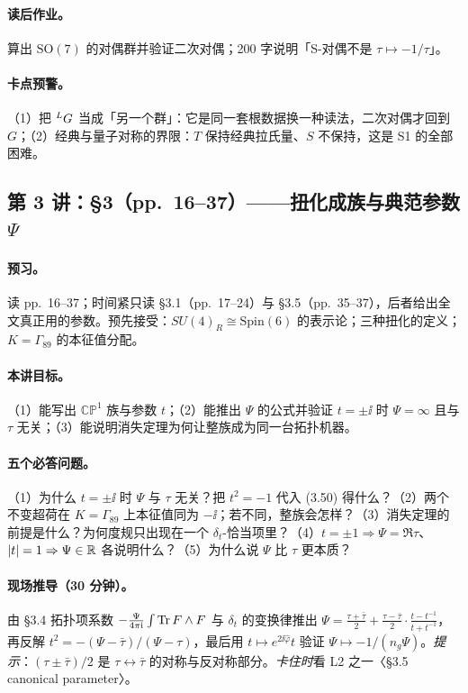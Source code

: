 {\paragraph{读后作业。}算出 \(\mathrm{SO}(7)\) 的对偶群并验证二次对偶；200 字说明「S-对偶不是 \(\tau\mapsto-1/\tau\)」。\pC

\paragraph{卡点预警。}（1）把 \({}^{L}G\) 当成「另一个群」：它是同一套根数据换一种读法，二次对偶才回到 \(G\)；（2）经典与量子对称的界限：\(T\) 保持经典拉氏量、\(S\) 不保持，这是 S1 的全部困难。\pC

\subsection{第 3 讲：\S3（pp.~16--37）——扭化成族与典范参数 \texorpdfstring{\(\Psi\)}{Psi}}

\paragraph{预习。}读 pp.~16--37；时间紧只读 §3.1（pp.~17--24）与 §3.5（pp.~35--37），后者给出全文真正用的参数。预先接受：\(SU(4)_R\cong\mathrm{Spin}(6)\) 的表示论；三种扭化的定义；\(K=\Gamma_{89}\) 的本征值分配。\pC

\paragraph{本讲目标。}（1）能写出 \(\mathbb{CP}^1\) 族与参数 \(t\)；（2）能推出 \(\Psi\) 的公式并验证 \(t=\pm\ii\) 时 \(\Psi=\infty\) 且与 \(\tau\) 无关；（3）能说明消失定理为何让整族成为同一台拓扑机器。\pC

\paragraph{五个必答问题。}（1）为什么 \(t=\pm\ii\) 时 \(\Psi\) 与 \(\tau\) 无关？把 \(t^{2}=-1\) 代入 (3.50) 得什么？（2）两个不变超荷在 \(K=\Gamma_{89}\) 上本征值同为 \(-\ii\)；若不同，整族会怎样？（3）消失定理的前提是什么？为何度规只出现在一个 \(\delta_t\)-恰当项里？（4）\(t=\pm1\Rightarrow\Psi=\Re\tau\)、\(|t|=1\Rightarrow\Psi\in\mathbb{R}\) 各说明什么？（5）为什么说 \(\Psi\) 比 \(\tau\) 更本质？\pC

\paragraph{现场推导（30 分钟）。}由 §3.4 拓扑项系数 \(-\frac{\Psi}{4\pi\mathrm{i}}\int\operatorname{Tr} F\wedge F\) 与 \(\delta_t\) 的变换律推出 $\Psi=\frac{\tau+\bar\tau}{2}+\frac{\tau-\bar\tau}{2}\cdot\frac{t-t^{-1}}{t+t^{-1}}$，再反解 \(t^{2}=-(\Psi-\bar\tau)/(\Psi-\tau)\)，最后用 \(t\mapsto e^{2\ii\hat\varphi}t\) 验证 \(\Psi\mapsto-1/(n_g\Psi)\)。\emph{提示}：\((\tau\pm\bar\tau)/2\) 是 \(\tau\leftrightarrow\bar\tau\) 的对称与反对称部分。\emph{卡住时}看 L2 之一〈§3.5 canonical parameter〉。\pC

}
